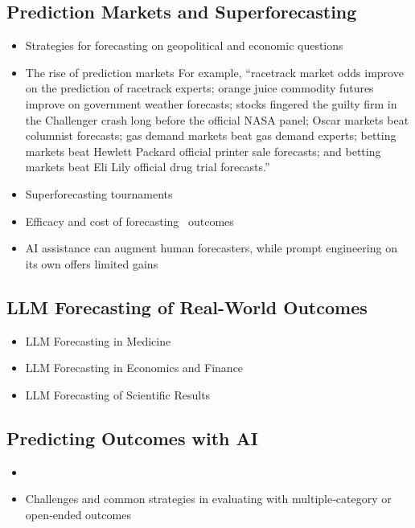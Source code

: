 \documentclass[12pt,a4paper]{article}
\begin{document}
\subsection*{Prediction Markets and Superforecasting}
\begin{itemize}
  \item Strategies for forecasting on geopolitical and economic questions 
  \item The rise of prediction markets  For example, ``racetrack market odds improve on the prediction of racetrack  experts; orange juice commodity futures improve on government weather forecasts;  stocks fingered the guilty firm in the Challenger crash long before the official NASA  panel; Oscar markets beat columnist forecasts; gas demand markets beat gas  demand experts; betting markets beat Hewlett Packard official printer sale  forecasts; and betting markets beat Eli Lily official drug trial forecasts.''
  \item Superforecasting tournaments 
  \item Efficacy and cost of forecasting \INTERVENTION\ outcomes 
  \item AI assistance can augment human forecasters, while prompt engineering on its own offers limited gains 
\end{itemize}
\subsection*{LLM Forecasting of Real-World Outcomes}
\begin{itemize}
  \item LLM Forecasting in Medicine
  \item LLM Forecasting in Economics and Finance 
  \item LLM Forecasting of Scientific Results  \   
\end{itemize}
\subsection*{Predicting Outcomes with AI \DOMAINCAPITALIZEDINTERVENTION}
\begin{itemize}
  \item \PREDICTINGOUTCOMES
  \item Challenges and common strategies in evaluating with multiple‑category or open‑ended outcomes   
\end{itemize}
\end{document}
